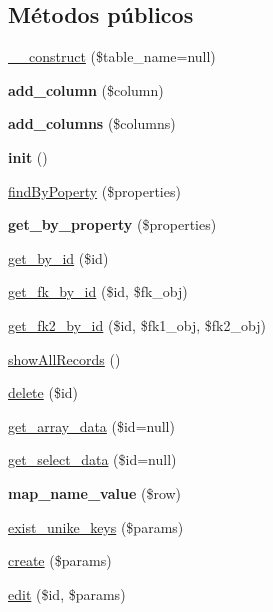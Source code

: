 \subsection*{Métodos públicos}
\begin{DoxyCompactItemize}
\item 
\mbox{\hyperlink{class_model_a186f8fcbe8092f888ba40e4ecef9f6a5}{\+\_\+\+\_\+construct}} (\$table\+\_\+name=null)
\item 
\mbox{\label{class_model_ab42dfa81494651af8757f81051d03faa}} 
{\bfseries add\+\_\+column} (\$column)
\item 
\mbox{\label{class_model_a8adf2b2c067639350b28d8058a384ac8}} 
{\bfseries add\+\_\+columns} (\$columns)
\item 
\mbox{\label{class_model_a907f3b1c1439c21be8fd9656bc834f38}} 
{\bfseries init} ()
\item 
\mbox{\hyperlink{class_model_a067c962b5ac1b38809aba6c8b7af46b1}{find\+By\+Poperty}} (\$properties)
\item 
\mbox{\label{class_model_a7d41415102cf7f720d7f1bff3ce68242}} 
{\bfseries get\+\_\+by\+\_\+property} (\$properties)
\item 
\mbox{\hyperlink{class_model_a708a0fc588b55e650ea0847da98f7b80}{get\+\_\+by\+\_\+id}} (\$id)
\item 
\mbox{\hyperlink{class_model_aca3b0fcfd538c6f2d0f1a05dfcea87ae}{get\+\_\+fk\+\_\+by\+\_\+id}} (\$id, \$fk\+\_\+obj)
\item 
\mbox{\hyperlink{class_model_af5ccad2ad89087e4454e71787163a6ba}{get\+\_\+fk2\+\_\+by\+\_\+id}} (\$id, \$fk1\+\_\+obj, \$fk2\+\_\+obj)
\item 
\mbox{\hyperlink{class_model_a7b1ac1e4fdca6e471ad62e21416c9ee7}{show\+All\+Records}} ()
\item 
\mbox{\hyperlink{class_model_ae045fb57af57685c24f2dbe5fbd7f684}{delete}} (\$id)
\item 
\mbox{\hyperlink{class_model_a62dd5265f2009c4111dc8117f815eb27}{get\+\_\+array\+\_\+data}} (\$id=null)
\item 
\mbox{\hyperlink{class_model_a85f2794443673870da8d4e34e1e3a307}{get\+\_\+select\+\_\+data}} (\$id=null)
\item 
\mbox{\label{class_model_a1465d4c58a91ed329132e52e60238ead}} 
{\bfseries map\+\_\+name\+\_\+value} (\$row)
\item 
\mbox{\hyperlink{class_model_afbf5f640ebb15823608a233cc3f2e8f5}{exist\+\_\+unike\+\_\+keys}} (\$params)
\item 
\mbox{\hyperlink{class_model_ab85f7264cd89a8180cacda746a089e9e}{create}} (\$params)
\item 
\mbox{\hyperlink{class_model_adae5eb27d36ae799ef4fa23dec88d302}{edit}} (\$id, \$params)
\end{DoxyCompactItemize}
